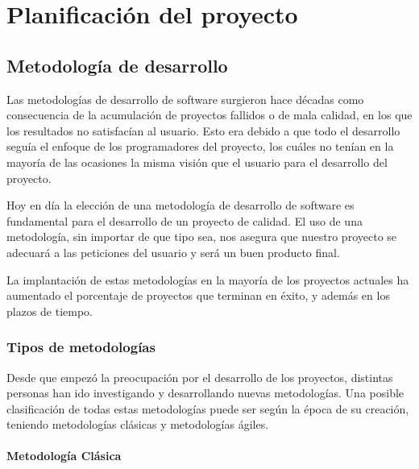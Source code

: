 \chapter{Planificación del proyecto}


\section{Metodología de desarrollo}

Las metodologías de desarrollo de software surgieron hace décadas como consecuencia de la acumulación de proyectos fallidos o de mala calidad, en los que los resultados no satisfacían al usuario. Esto era debido a que todo el desarrollo seguía el enfoque de los programadores del proyecto, los cuáles no tenían en la mayoría de las ocasiones la misma visión que el usuario para el desarrollo del proyecto.

Hoy en día la elección de una metodología de desarrollo de software es fundamental para el desarrollo de un proyecto de calidad. El uso de una metodología, sin importar de que tipo sea, nos asegura que nuestro proyecto se adecuará a las peticiones del usuario y será un buen producto final.

La implantación de estas metodologías en la mayoría de los proyectos actuales ha aumentado el porcentaje de proyectos que terminan en éxito, y además en los plazos de tiempo.


\subsection{Tipos de metodologías}

Desde que empezó la preocupación por el desarrollo de los proyectos, distintas personas han ido investigando y desarrollando nuevas metodologías. Una posible clasificación de todas estas metodologías puede ser según la época de su creación, teniendo metodologías clásicas y metodologías ágiles.

\subsubsection{Metodología Clásica}

